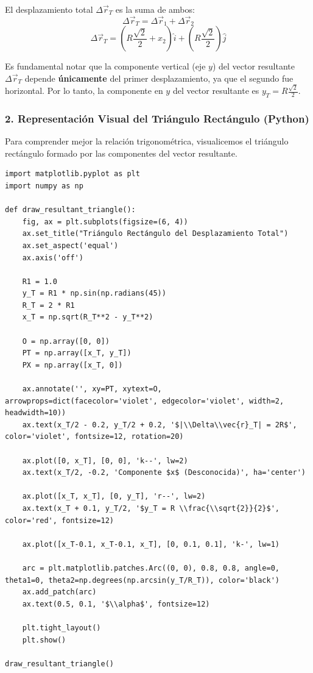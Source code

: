 \documentclass[12pt, a4paper]{article}
\begin{document}
El desplazamiento total $\Delta\vec{r}_T$ es la suma de ambos:
$$ \Delta\vec{r}_T = \Delta\vec{r}_1 + \Delta\vec{r}_2 $$
$$ \Delta\vec{r}_T = \left( R \frac{\sqrt{2}}{2} + x_2 \right)\hat{i} + \left( R \frac{\sqrt{2}}{2} \right)\hat{j} $$

Es fundamental notar que la componente vertical (eje $y$) del vector resultante $\Delta\vec{r}_T$ depende \textbf{únicamente} del primer desplazamiento, ya que el segundo fue horizontal.
Por lo tanto, la componente en $y$ del vector resultante es $y_T = R \frac{\sqrt{2}}{2}$.

\subsubsection*{2. Representación Visual del Triángulo Rectángulo (Python)}
Para comprender mejor la relación trigonométrica, visualicemos el triángulo rectángulo formado por las componentes del vector resultante.

\begin{lstlisting}
import matplotlib.pyplot as plt
import numpy as np

def draw_resultant_triangle():
    fig, ax = plt.subplots(figsize=(6, 4))
    ax.set_title("Triángulo Rectángulo del Desplazamiento Total")
    ax.set_aspect('equal')
    ax.axis('off')
    
    R1 = 1.0
    y_T = R1 * np.sin(np.radians(45))
    R_T = 2 * R1
    x_T = np.sqrt(R_T**2 - y_T**2)
    
    O = np.array([0, 0])
    PT = np.array([x_T, y_T])
    PX = np.array([x_T, 0])
    
    ax.annotate('', xy=PT, xytext=O, arrowprops=dict(facecolor='violet', edgecolor='violet', width=2, headwidth=10))
    ax.text(x_T/2 - 0.2, y_T/2 + 0.2, '$|\\Delta\\vec{r}_T| = 2R$', color='violet', fontsize=12, rotation=20)
    
    ax.plot([0, x_T], [0, 0], 'k--', lw=2)
    ax.text(x_T/2, -0.2, 'Componente $x$ (Desconocida)', ha='center')
    
    ax.plot([x_T, x_T], [0, y_T], 'r--', lw=2)
    ax.text(x_T + 0.1, y_T/2, '$y_T = R \\frac{\\sqrt{2}}{2}$', color='red', fontsize=12)
    
    ax.plot([x_T-0.1, x_T-0.1, x_T], [0, 0.1, 0.1], 'k-', lw=1)
    
    arc = plt.matplotlib.patches.Arc((0, 0), 0.8, 0.8, angle=0, theta1=0, theta2=np.degrees(np.arcsin(y_T/R_T)), color='black')
    ax.add_patch(arc)
    ax.text(0.5, 0.1, '$\\alpha$', fontsize=12)

    plt.tight_layout()
    plt.show()

draw_resultant_triangle()
\end{lstlisting}
\end{document}
